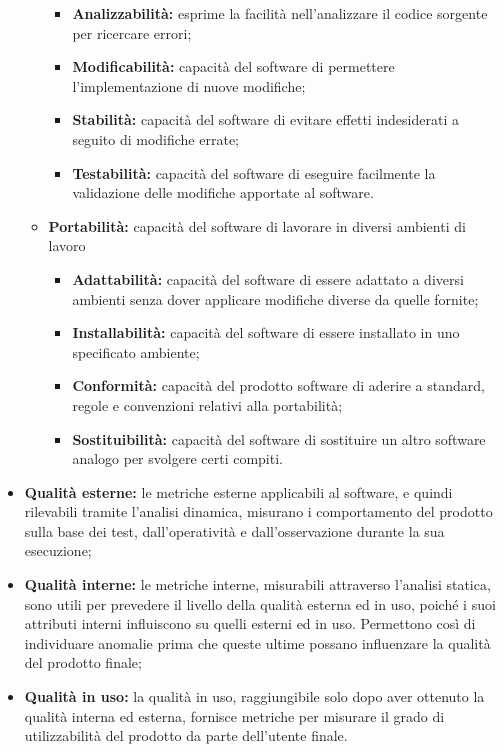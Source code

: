 \begin{itemize}
\begin{itemize}
\begin{itemize}
							\item \textbf{Analizzabilità:} esprime la facilità nell'analizzare il codice sorgente per ricercare errori; 
							\item \textbf{Modificabilità:} capacità del software di permettere l'implementazione di nuove modifiche;
							\item \textbf{Stabilità:} capacità del software di evitare effetti indesiderati a seguito di modifiche errate;
							\item \textbf{Testabilità:} capacità del software di eseguire facilmente la validazione delle modifiche apportate al software.
						\end{itemize}
					\item \textbf{Portabilità:} capacità del software di lavorare in diversi ambienti di lavoro
						\begin{itemize}
							\item \textbf{Adattabilità:} capacità del software di essere adattato a diversi ambienti senza dover applicare modifiche diverse da quelle fornite;
							\item \textbf{Installabilità:} capacità del software di essere installato in uno specificato ambiente;
							\item \textbf{Conformità:} capacità del prodotto software di aderire a standard, regole e convenzioni relativi alla portabilità;
							\item \textbf{Sostituibilità:} capacità del software di sostituire un altro software analogo per svolgere certi compiti.
						\end{itemize}
				\end{itemize}
			\item \textbf{Qualità esterne: } le metriche esterne applicabili al software, e quindi rilevabili tramite l'analisi dinamica, misurano i comportamento del prodotto sulla base dei test, dall'operatività e dall'osservazione durante la sua esecuzione;
			\item \textbf{Qualità interne: } le metriche interne, misurabili attraverso l'analisi statica, sono utili per prevedere il livello della qualità esterna ed in uso, poiché i suoi attributi interni influiscono su quelli esterni ed in uso. Permettono così di individuare anomalie prima che queste ultime possano influenzare la qualità del prodotto finale;
			\item \textbf{Qualità in uso: } la qualità in uso, raggiungibile solo dopo aver ottenuto la qualità interna ed esterna, fornisce metriche per misurare il grado di utilizzabilità del prodotto da parte dell'utente finale.
		\end{itemize}
		
